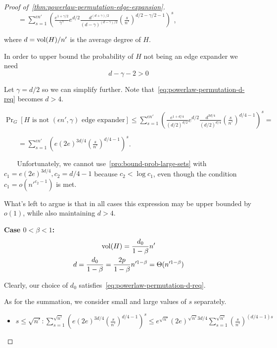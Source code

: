 \begin{proof}[Proof of~\autoref{thm:powerlaw-permutation-edge-expansion}]
    $\qquad=\sum_{s=1}^{\epsilon n'}{\left(
        \frac{e^{1+\gamma/2}}{\gamma^\gamma}
        e^{d/2}
        \frac{d^{(d+\gamma)/2}}{(d-\gamma)^{(d-\gamma)/2}}
        \left(\frac{s}{n'}\right)^{d/2-\gamma/2-1}
    \right)^s}$,
    
    where $d=\operatorname*{vol}(H)/n'$ is the average degree of $H$.
    
    In order to upper bound the probability of $H$ not being an edge expander we need
    \begin{equation}
        \label{eq:powerlaw-permutation-d-req}
        d-\gamma-2>0
    \end{equation}
    
    Let $\gamma=d/2$ so we can simplify further.
    Note that~\eqref{eq:powerlaw-permutation-d-req} becomes $d>4$.
    
    $\Pr_G[H\text{ is not }(\epsilon n',\gamma)\text{ edge expander}]\leq\sum_{s=1}^{\epsilon n'}{\left(
        \frac{e^{1+d/4}}{(d/2)^{d/2}}
        e^{d/2}
        \frac{d^{3d/4}}{(d/2)^{d/4}}
        \left(\frac{s}{n'}\right)^{d/4-1}
    \right)^s}=$
    
    $\qquad=\sum_{s=1}^{\epsilon n'}{\left(
        e
        (2e)^{3d/4}
        \left(\frac{s}{n'}\right)^{d/4-1}
    \right)^s}$.

    \begin{shaded}
    $\quad\;\;$
    Unfortunately, we cannot use~\autoref{pro:bound-prob-large-sets}
    with $c_1=e(2e)^{3d/4},c_2=d/4-1$ because $c_2<\log c_1$,
    even though the condition $c_1=o\left(n'^{c_2-1}\right)$ is met.
    \end{shaded}

    What's left to argue is that in all cases this expression may be upper bounded by $o(1)$, while also maintaining $d>4$.
    
    \textbf{Case $0<\beta<1$:}
    \begin{gather*}
        \operatorname*{vol}(H)=\frac{d_0}{1-\beta}n'\\
        d=\frac{d_0}{1-\beta}=\frac{2p}{1-\beta}n'^{1-\beta}=\Theta(n'^{1-\beta})
    \end{gather*}
    
    Clearly, our choice of $d_0$ satisfies~\eqref{eq:powerlaw-permutation-d-req}.

    As for the summation, we consider small and large values of $s$ separately.
    \begin{itemize}
        \item $s\leq\sqrt{n'}:
        \sum_{s=1}^{\sqrt{n'}}{\left(
            e
            (2e)^{3d/4}
            \left(\frac{s}{n'}\right)^{d/4-1}
        \right)^s}
        \leq e^{\sqrt{n'}}(2e)^{\sqrt{n'}3d/4}\sum_{s=1}^{\sqrt{n'}}{
            \left(\frac{s}{n'}\right)^{(d/4-1)s}
        }$
    

\end{itemize}
\end{proof}
